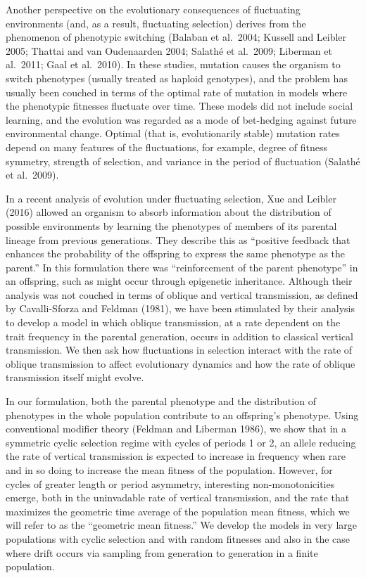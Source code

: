Another perspective on the evolutionary consequences of fluctuating environments (and, as a result, fluctuating selection) derives from the phenomenon of phenotypic switching (Balaban et al.\ 2004; Kussell and Leibler 2005; Thattai and van Oudenaarden 2004; Salath\'e et al.\ 2009; Liberman et al.\ 2011; Gaal et al.\ 2010). In these studies, mutation causes the organism to switch phenotypes (usually treated as haploid genotypes), and the problem has usually been couched in terms of the optimal rate of mutation in models where the phenotypic fitnesses fluctuate over time. These models did not include social learning, and the evolution was regarded as a mode of bet-hedging against future environmental change. Optimal (that is, evolutionarily stable) mutation rates depend on many features of the fluctuations, for example,  degree of fitness symmetry, strength of selection, and variance in the period of fluctuation (Salath\'e et al.\ 2009).

In a recent analysis of evolution under fluctuating selection, Xue and Leibler (2016) allowed an organism to absorb information about the distribution of possible environments by learning the phenotypes of members of its parental lineage from previous generations. They describe this as ``positive feedback that enhances the probability of the offspring to express the same phenotype as the parent.'' In this formulation there was ``reinforcement of the parent phenotype'' in an offspring, such as might occur through epigenetic inheritance. Although their analysis was not couched in terms of oblique and vertical transmission, as defined by Cavalli-Sforza and Feldman (1981), we have been stimulated by their analysis to develop a model in which oblique transmission, at a rate dependent on the trait frequency in the parental generation, occurs in addition to classical vertical transmission. We then ask how fluctuations in selection interact with the rate of oblique transmission to affect evolutionary dynamics and how the rate of oblique transmission itself might evolve. 

In our formulation, both the parental phenotype and the distribution of phenotypes in the whole population contribute to an offspring's phenotype. Using conventional modifier theory (Feldman and Liberman 1986), we show that in a symmetric cyclic selection regime with cycles of periods 1 or 2, an allele reducing the rate of vertical transmission is expected to increase in frequency when rare and in so doing to increase the mean fitness of the population. However, for cycles of greater length or period asymmetry, interesting non-monotonicities emerge, both in the uninvadable rate of vertical transmission, and the rate that maximizes the geometric time average of the population mean fitness, which we will refer to as the ``geometric mean fitness.'' We develop the models in very large populations with cyclic selection and with random fitnesses and also in the case where drift occurs via sampling from generation to generation in a finite population.

